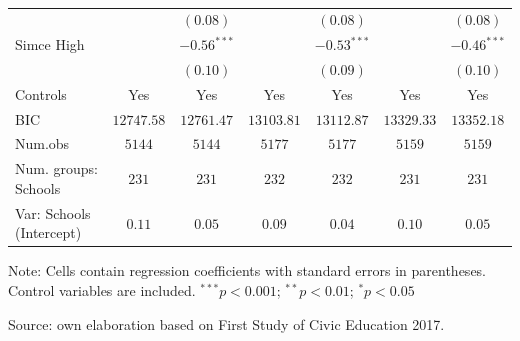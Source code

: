 \documentclass[
  12pt,
  letterpaper,
]{article}
\begin{document}
\begin{table}
{\begin{center}
{\begin{threeparttable}
\begin{tabular}{l c c c c c c}
                                          &               & $(0.08)$      &               & $(0.08)$      &               & $(0.08)$      \\
\quad Simce High                          &               & $-0.56^{***}$ &               & $-0.53^{***}$ &               & $-0.46^{***}$ \\
                                          &               & $(0.10)$      &               & $(0.09)$      &               & $(0.10)$      \\
\midrule
Controls                                  & Yes           & Yes           & Yes           & Yes           & Yes           & Yes           \\
BIC                                       & $12747.58$    & $12761.47$    & $13103.81$    & $13112.87$    & $13329.33$    & $13352.18$    \\
Num.obs                                   & $5144$        & $5144$        & $5177$        & $5177$        & $5159$        & $5159$        \\
Num. groups: Schools                      & $231$         & $231$         & $232$         & $232$         & $231$         & $231$         \\
Var: Schools (Intercept)                  & $0.11$        & $0.05$        & $0.09$        & $0.04$        & $0.10$        & $0.05$        \\
\bottomrule
\end{tabular}
\begin{tablenotes}[flushleft]
\scriptsize{\item Note: Cells contain regression coefficients with standard errors in parentheses. Control variables are included. $^{***}p<0.001$; $^{**}p<0.01$; $^{*}p<0.05$ \\ \item Source: own elaboration based on First Study of Civic Education 2017.}
\end{tablenotes}
\end{threeparttable}
}
\caption{}
\label{table:coefficients}
\end{center}

}

\end{table}%
\end{document}
